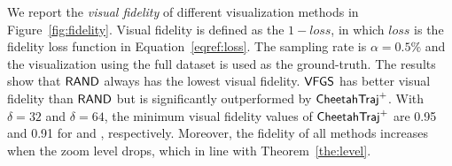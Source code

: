 We report the \textit{visual fidelity} of different visualization methods in Figure~\ref{fig:fidelity}. Visual fidelity is defined as the $1-loss$, in which $loss$ is the fidelity loss function in Equation~\eqref{eqref:loss}. The sampling rate is $\alpha=0.5\%$ and the visualization using the full dataset is used as the ground-truth. The results show that $\mathsf{RAND}$ always has the lowest  visual fidelity. $\mathsf{VFGS}$ has better visual fidelity than $\mathsf{RAND}$ but is significantly outperformed by $\mathsf{CheetahTraj}^{+}$. With $\delta=32$ and $\delta=64$, the minimum visual fidelity values of $\mathsf{CheetahTraj}^{+}$ are 0.95 and 0.91 for \pt{} and \sz{}, respectively. Moreover, the fidelity of all methods increases when the zoom level drops, which in line with Theorem~\ref{the:level}.




